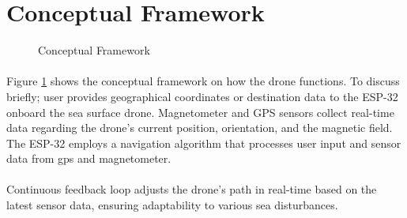 \section{Conceptual Framework}
\begin{figure}[ht]
\begin{center}
\end{center}

\caption{Conceptual Framework}
\label{fig:ConceptualFramework}
\end{figure}

\paragraph{} Figure \ref{fig:ConceptualFramework} shows the conceptual framework on how the drone functions. To discuss briefly; user provides geographical
           coordinates or destination data to the ESP-32 onboard the sea surface drone. Magnetometer and GPS sensors collect real-time data regarding the 
           drone's current position, orientation, and the magnetic field. The ESP-32 employs a navigation algorithm that processes user input and sensor 
           data from gps and magnetometer.

\paragraph{} Continuous feedback loop adjusts the drone's path in real-time based on the latest sensor data, ensuring adaptability to various sea disturbances.


